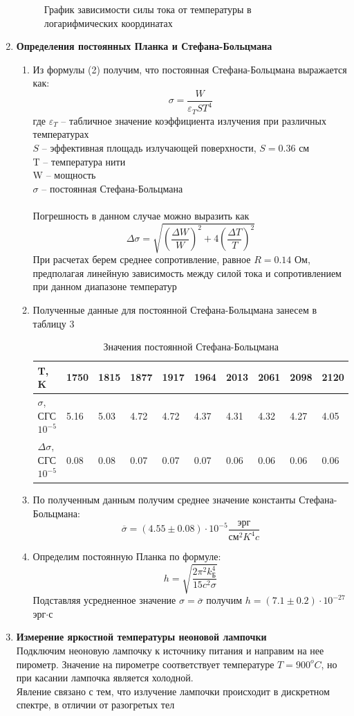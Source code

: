 \documentclass[a4paper,12pt]{article}
\begin{document}
\begin{enumerate}
\begin{figure}[h!]
\label{plot}
\caption{График зависимости силы тока от температуры в логарифмических координатах}
\end{figure}
\item \textbf{Определения постоянных Планка и Стефана-Больцмана}
\begin{enumerate}
\item Из формулы (2) получим, что постоянная Стефана-Больцмана выражается как:
\begin{equation}
\sigma = \frac{W}{\varepsilon_TST^4}
\end{equation}
где $\varepsilon_T$ -- табличное значение коэффициента излучения при различных температурах\\
$S$ -- эффективная площадь излучающей поверхности, $S = 0.36$ см\\
T -- температура нити\\
W -- мощность\\
$\sigma$ -- постоянная Стефана-Больцмана\\\\
Погрешность в данном случае можно выразить как 
\[\Delta\sigma = \sqrt{\left(\frac{\Delta W}{W}\right)^2 + 4\left(\frac{\Delta T}{T}\right)^2}\]
При расчетах берем среднее сопротивление, равное $R = 0.14 $ Ом, предполагая линейную зависимость между силой тока и сопротивлением при данном диапазоне температур
\item Полученные данные для постоянной Стефана-Больцмана занесем в таблицу 3
\begin{table}[h!]
\centering
\begin{tabular}{|l|l|l|l|l|l|l|l|l|l|}
\hline
T, K                          & 1750 & 1815 & 1877 & 1917 & 1964 & 2013 & 2061 & 2098 & 2120 \\ \hline
$\sigma$, СГС $10^{-5}$       & 5.16 & 5.03 & 4.72 & 4.72 & 4.37 & 4.31 & 4.32 & 4.27 & 4.05 \\ \hline
$\Delta\sigma,$ СГС $10^{-5}$ & 0.08 & 0.08 & 0.07 & 0.07 & 0.07 & 0.06 & 0.06 & 0.06 & 0.06 \\ \hline
\end{tabular}
\caption{Значения постоянной Стефана-Больцмана}
\label{SB}
\end{table}

\item По полученным данным получим среднее значение константы Стефана-Больцмана:
\[\overline{\sigma} = (4.55 \pm 0.08)\cdot 10^{-5} \frac{\text{эрг}}{\text{см}^2K^4c}\]
\item Определим постоянную Планка по формуле: 
\[h = \sqrt{\frac{2\pi^2k_{\text{Б}}^4}{15c^2\sigma}}\]
Подставляя усредненное значение $\sigma = \overline{\sigma}$ получим $h = (7.1 \pm 0.2)\cdot 10^{-27}$ эрг$\cdot$с
\end{enumerate}
\item \textbf{Измерение яркостной температуры неоновой лампочки}\\
Подключим неоновую лампочку к источнику питания и направим на нее пирометр. Значение на пирометре соответствует температуре $T = 900 ^oC$, но при касании лампочка является холодной.\\
Явление связано с тем, что излучение лампочки происходит в дискретном спектре, в отличии от разогретых тел
\end{enumerate}
\end{document}
